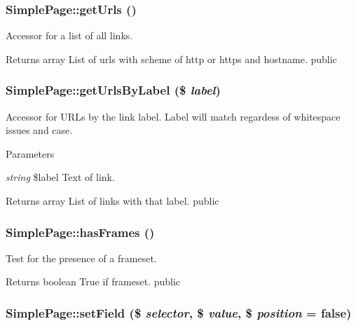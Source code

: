 \hypertarget{class_simple_page_ab8918b36cab735d972e9653ab16d27ff}{
\subsubsection[{getUrls}]{\setlength{\rightskip}{0pt plus 5cm}SimplePage::getUrls ()}}
\label{class_simple_page_ab8918b36cab735d972e9653ab16d27ff}
Accessor for a list of all links. \begin{DoxyReturn}{Returns}
array List of urls with scheme of http or https and hostname.  public 
\end{DoxyReturn}
\hypertarget{class_simple_page_a1614d872793684018f3911cc7cad37c3}{
\subsubsection[{getUrlsByLabel}]{\setlength{\rightskip}{0pt plus 5cm}SimplePage::getUrlsByLabel (\$ {\em label})}}
\label{class_simple_page_a1614d872793684018f3911cc7cad37c3}
Accessor for URLs by the link label. Label will match regardess of whitespace issues and case. 
\begin{DoxyParams}{Parameters}
\item[{\em string}]\$label Text of link. \end{DoxyParams}
\begin{DoxyReturn}{Returns}
array List of links with that label.  public 
\end{DoxyReturn}
\hypertarget{class_simple_page_a57d9b71b767381553cda8735fdb4c939}{
\subsubsection[{hasFrames}]{\setlength{\rightskip}{0pt plus 5cm}SimplePage::hasFrames ()}}
\label{class_simple_page_a57d9b71b767381553cda8735fdb4c939}
Test for the presence of a frameset. \begin{DoxyReturn}{Returns}
boolean True if frameset.  public 
\end{DoxyReturn}
\hypertarget{class_simple_page_a03f791afb1690cd23e646142f3f25739}{
\subsubsection[{setField}]{\setlength{\rightskip}{0pt plus 5cm}SimplePage::setField (\$ {\em selector}, \/  \$ {\em value}, \/  \$ {\em position} = {\ttfamily false})}}
